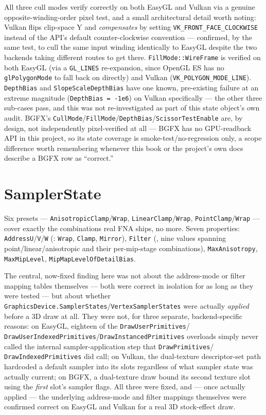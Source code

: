 All three cull modes verify correctly on both EasyGL and Vulkan via a genuine
opposite-winding-order pixel test, and a small architectural detail worth noting: Vulkan
flips clip-space Y and \emph{compensates} by setting \texttt{VK\_FRONT\_FACE\_CLOCKWISE}
instead of the API's default counter-clockwise convention --- confirmed, by the same test, to
cull the same input winding identically to EasyGL despite the two backends taking different
routes to get there. \texttt{FillMode::WireFrame} is verified on both EasyGL (via a
\texttt{GL\_LINES} re-expansion, since OpenGL ES has no \texttt{glPolygonMode} to fall back
on directly) and Vulkan (\texttt{VK\_POLYGON\_MODE\_LINE}). \texttt{DepthBias} and
\texttt{SlopeScaleDepthBias} have one known, pre-existing failure at an extreme magnitude
(\texttt{DepthBias = -1e6}) on Vulkan specifically --- the other three sub-cases pass, and
this was not re-investigated as part of this state object's own audit. BGFX's
\texttt{CullMode}/\texttt{FillMode}/\texttt{DepthBias}/\texttt{ScissorTestEnable} are, by
design, not independently pixel-verified at all --- BGFX has no GPU-readback API in this
project, so its state coverage is smoke-test/no-regression only, a scope difference worth
remembering whenever this book or the project's own docs describe a BGFX row as
``correct.''

\section{SamplerState}

Six presets --- \texttt{AnisotropicClamp}/\texttt{Wrap}, \texttt{LinearClamp}/\texttt{Wrap},
\texttt{PointClamp}/\texttt{Wrap} --- cover exactly the combinations real FNA ships, no more.
Seven properties: \texttt{AddressU}/\texttt{V}/\texttt{W} (:
\texttt{Wrap}, \texttt{Clamp}, \texttt{Mirror}), \texttt{Filter} (,
nine values spanning point/linear/anisotropic and their per-mip-stage combinations),
\texttt{MaxAnisotropy}, \texttt{MaxMipLevel}, \texttt{MipMapLevelOfDetailBias}.

The central, now-fixed finding here was not about the address-mode or filter mapping tables
themselves --- both were correct in isolation for as long as they were tested --- but about
whether \texttt{GraphicsDevice.SamplerStates}/\texttt{VertexSamplerStates} were actually
\emph{applied} before a 3D draw at all. They were not, for three separate, backend-specific
reasons: on EasyGL, eighteen of the \texttt{DrawUserPrimitives}/%
\texttt{DrawUserIndexedPrimitives}/\texttt{DrawInstancedPrimitives} overloads simply never
called the internal sampler-application step that \texttt{DrawPrimitives}/%
\texttt{DrawIndexedPrimitives} did call; on Vulkan, the dual-texture descriptor-set path
hardcoded a default sampler into its slots regardless of what sampler state was actually
current; on BGFX, a dual-texture draw bound its second texture slot using the \emph{first}
slot's sampler flags. All three were fixed, and --- once actually applied --- the underlying
address-mode and filter mappings themselves were confirmed correct on EasyGL and Vulkan for a
real 3D stock-effect draw.

